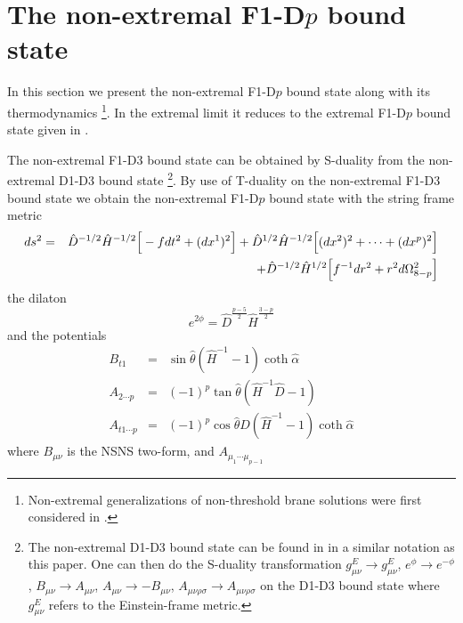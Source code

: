 \documentclass[a4paper,twoside,titlepage,12pt]{article}
\begin{document}
\section{The non-extremal F1-D$p$ bound state}
\label{secF1Dp}

In this section we present the non-extremal F1-D$p$ bound state
along with its thermodynamics%
\footnote{Non-extremal generalizations of non-threshold 
brane solutions were first considered in \cite{Costa:1996re}.}. 
In the extremal limit
it reduces to the extremal F1-D$p$ bound state 
given in \cite{Green:1996vh,Russo:1997if,Costa:1996zd,Lu:1999uc}.

The non-extremal F1-D3 bound state can be obtained by
S-duality from the non-extremal D1-D3 bound state%
\footnote{The non-extremal D1-D3 bound state can be found
in \cite{Harmark:1999rb} in a similar notation as this paper. 
One can then do the S-duality transformation 
\( g^E_{\mu \nu} \rightarrow g^E_{\mu \nu} \), 
\( e^{\phi} \rightarrow e^{-\phi} \), 
\( B_{\mu \nu} \rightarrow A_{\mu \nu} \),
\( A_{\mu \nu} \rightarrow - B_{\mu \nu} \), 
\( A_{\mu \nu \rho \sigma} \rightarrow A_{\mu \nu \rho \sigma} \) 
on the D1-D3 bound state where \( g^E_{\mu \nu} \) refers to the
Einstein-frame metric.}.
By use of T-duality on the non-extremal 
F1-D3 bound state we obtain
the non-extremal F1-D$p$ bound state with the string frame metric
%
\begin{eqnarray}
\label{NEmet}
ds^2 &=& \hat{D}^{-1/2} \hat{H}^{-1/2} \Big[ - f dt^2 + (dx^1)^2 \Big]
+ \hat{D}^{1/2} \hat{H}^{-1/2} \Big[ (dx^2)^2 + \cdots + (dx^p)^2 \Big]
\nonumber \\ && + \hat{D}^{-1/2} \hat{H}^{1/2} 
\Big[ f^{-1} dr^2 + r^2 d\Omega_{8-p}^2 \Big]
\end{eqnarray}
%
the dilaton
%
\begin{equation}
\label{NEdil}
e^{2\phi} = \hat{D}^{\frac{p-5}{2}} \hat{H}^{\frac{3-p}{2}}
\end{equation}
%
and the potentials
%
\begin{eqnarray}
\label{NEpot1}
B_{t1} &=& \sin \hat{\theta} ( \hat{H}^{-1} - 1 ) \coth \hat{\alpha}
\\
A_{2 \cdots p} &=& (-1)^p \tan \hat{\theta} ( \hat{H}^{-1} \hat{D} - 1 )
\\
\label{NEpot3}
A_{t1 \cdots p} &=& (-1)^p \cos \hat{\theta} \hat{D} ( \hat{H}^{-1} - 1 ) 
\coth \hat{\alpha}
\end{eqnarray}
%
where $B_{\mu \nu}$ is the NSNS two-form, and $A_{\mu_1 \cdots \mu_{p-1}}$
\end{document}

